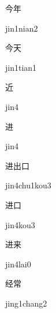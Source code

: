 \begin{multicols*}{2}
\begin{verbete}{今年}
\begin{pronuncia}{jin1nian2}
\end{pronuncia}
\end{verbete}

\begin{verbete}{今天}
\begin{pronuncia}{jin1tian1}
\end{pronuncia}
\end{verbete}

\begin{verbete}[jin4]{近}
\begin{pronuncia}{jin4}
\end{pronuncia}
\end{verbete}

\begin{verbete}[jin4]{进}
\begin{pronuncia}{jin4}
\end{pronuncia}
\end{verbete}

\begin{verbete}{进出口}
\begin{pronuncia}{jin4chu1kou3}
\end{pronuncia}
\end{verbete}

\begin{verbete}{进口}
\begin{pronuncia}{jin4kou3}
\end{pronuncia}
\end{verbete}

\begin{verbete}{进来}
\begin{pronuncia}{jin4lai0}
\end{pronuncia}
\end{verbete}

\begin{verbete}{经常}
\begin{pronuncia}{jing1chang2}
\end{pronuncia}
\end{verbete}


\end{multicols*}
